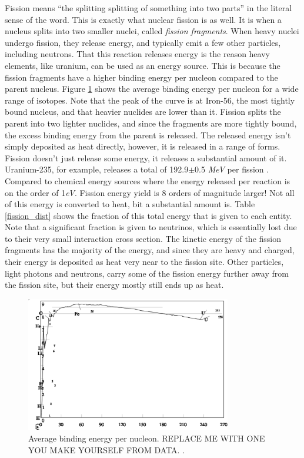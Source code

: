 Fission means ``the splitting splitting of something into two parts'' in the literal sense of the word.  This is exactly what nuclear fission is as well.  It is when a nucleus splits into two smaller nuclei, called \emph{fission fragments}.  When heavy nuclei undergo fission, they release energy, and typically emit a few other particles, including neutrons.  That this reaction releases energy is the reason heavy elements, like uranium, can be used as an energy source.  This is because the fission fragments have a higher binding energy per nucleon compared to the parent nucleus.  Figure \ref{binding_e_per_nuc} shows the average binding energy per nucleon for a wide range of isotopes.  Note that the peak of the curve is at Iron-56, the most tightly bound nucleus, and that heavier nuclides are lower than it.  Fission splits the parent into two lighter nuclides, and since the fragments are more tightly bound, the excess binding energy from the parent is released.  The released energy isn't simply deposited as heat directly, however, it is released in a range of forms.  Fission doesn't just release some energy, it releases a substantial amount of it.  Uranium-235, for example, releases a total of 192.9$\pm$0.5 \emph{MeV} per fission \cite{duderstadt}.  Compared to chemical energy sources where the energy released per reaction is on the order of 1\emph{eV}.  Fission energy yield is 8 orders of magnitude larger!  Not all of this energy is converted to heat, bit a substantial amount is.  Table \ref{fission_dist} shows the fraction of this total energy that is given to each entity.  Note that a significant fraction is given to neutrinos, which is essentially lost due to their very small interaction cross section.  The kinetic energy of the fission fragments has the majority of the energy, and since they are heavy and charged, their energy is deposited as heat very near to the fission site.  Other particles, light photons and neutrons, carry some of the fission energy further away from the fission site, but their energy mostly still ends up as heat.
  
\begin{figure}[h!]
  \centering
    \includegraphics[width=0.8\textwidth]{graphics/binding_e_per_nuc.eps}
     \caption{Average binding energy per nucleon.  REPLACE ME WITH ONE YOU MAKE YOURSELF FROM DATA. \cite{}.\label{binding_e_per_nuc}}
\end{figure}

